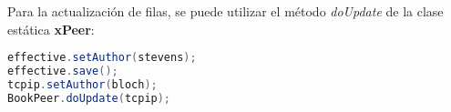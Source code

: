 Para la actualización de filas, se puede utilizar el método {\em doUpdate} de la clase estática {\bf xPeer}:

\begin{lstlisting}[language=Java]
effective.setAuthor(stevens);
effective.save();
tcpip.setAuthor(bloch);
BookPeer.doUpdate(tcpip);
\end{lstlisting}
